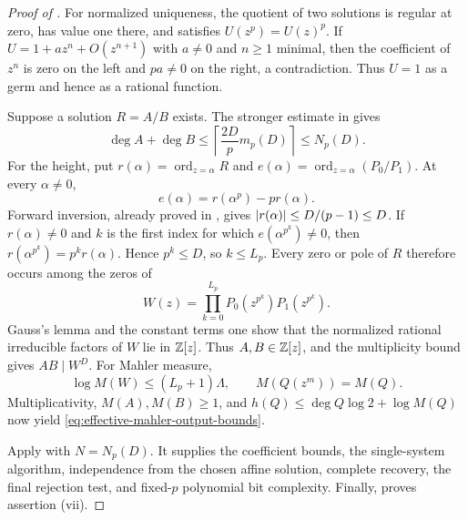 \begin{proof}[Proof of ]
For normalized uniqueness, the quotient of two solutions is regular at zero,
has value one there, and satisfies \(U(z^p)=U(z)^p\).  If
\(U=1+az^n+O(z^{n+1})\) with \(a\ne0\) and \(n\ge1\) minimal, then the
coefficient of \(z^n\) is zero on the left and \(pa\ne0\) on the right, a
contradiction.  Thus \(U=1\) as a germ and hence as a rational function.

Suppose a solution \(R=A/B\) exists.  The stronger estimate in
 gives
\[
 \deg A+\deg B\le
 \left\lceil\frac{2D}{p}m_p(D)\right\rceil\le N_p(D).
\]
For the height, put
\(r(\alpha)=\operatorname{ord}_{z=\alpha}R\) and
\(e(\alpha)=\operatorname{ord}_{z=\alpha}(P_0/P_1)\).  At every
\(\alpha\ne0\),
\begin{equation}\label{eq:effective-mahler-divisor-recurrence}
 e(\alpha)=r(\alpha^p)-pr(\alpha).
\end{equation}
Forward inversion, already proved in
, gives
\(\lvert r(\alpha) \rvert\le D/(p-1)\le D\).  If \(r(\alpha)\ne0\) and \(k\) is
the first index for which \(e(\alpha^{p^k})\ne0\), then
\(r(\alpha^{p^k})=p^kr(\alpha)\).  Hence \(p^k\le D\), so \(k\le L_p\).
Every zero or pole of \(R\) therefore occurs among the zeros of
\begin{equation}\label{eq:effective-mahler-window-polynomial}
 W(z)=\prod_{k=0}^{L_p}P_0(z^{p^k})P_1(z^{p^k}).
\end{equation}
Gauss's lemma and the constant terms one show that the normalized rational
irreducible factors of \(W\) lie in \(\mathbb{Z}[z]\).  Thus \(A,B\in\mathbb{Z}[z]\), and
the multiplicity bound gives \(AB\mid W^D\).  For Mahler measure,
\[
 \log M(W)\le(L_p+1)\Lambda,
 \qquad M(Q(z^m))=M(Q).
\]
Multiplicativity, \(M(A),M(B)\ge1\), and
\(h(Q)\le\deg Q\log2+\log M(Q)\) now yield
\eqref{eq:effective-mahler-output-bounds}.

Apply  with
\(N=N_p(D)\).  It supplies the coefficient bounds, the single-system
algorithm, independence from the chosen affine solution, complete recovery,
the final rejection test, and fixed-\(p\) polynomial bit complexity.  Finally,
 proves assertion
\textup{(vii)}.
\end{proof}

